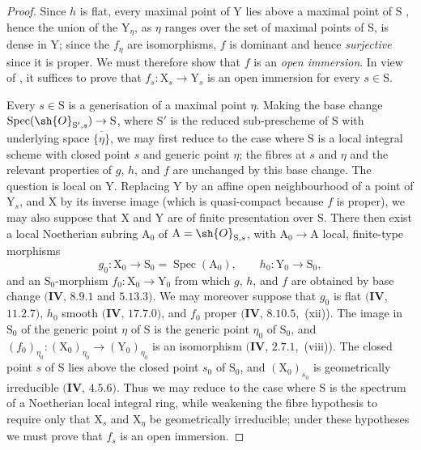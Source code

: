 \begin{proof}
Since $h$ is flat, every maximal point of $\mathrm{Y}$ lies above a maximal point of $\mathrm{S}$ , hence the union of the $\mathrm{Y}_\eta$, as $\eta$ ranges over the set of maximal points of $\mathrm{S}$, is dense in $\mathrm{Y}$; since the $f_\eta$ are isomorphisms, $f$ is dominant and hence \emph{surjective} since it is proper.
We must therefore show that $f$ is an \emph{open immersion}.
In view of , it suffices to prove that $f_s:\mathrm{X}_s\to\mathrm{Y}_s$ is an open immersion for every $s\in\mathrm{S}$.

Every $s\in\mathrm{S}$ is a generisation of a maximal point $\eta$.  Making the base change $\operatorname{Spec}(\sh{O}_{\mathrm{S}',s})\to\mathrm{S}$, where $\mathrm{S}'$ is the reduced sub-prescheme of $\mathrm{S}$ with underlying space $\overline{\{\eta\}}$, we may first reduce to the case where $\mathrm{S}$ is a local integral scheme with closed point $s$ and generic point $\eta$; the fibres at $s$ and $\eta$ and the relevant properties of $g$, $h$, and $f$ are unchanged by this base change.
The question is local on $\mathrm{Y}$.  Replacing $\mathrm{Y}$ by an affine open neighbourhood of a point of $\mathrm{Y}_s$, and $\mathrm{X}$ by its inverse image (which is quasi-compact because $f$ is proper), we may also suppose that $\mathrm{X}$ and $\mathrm{Y}$ are of finite presentation over $\mathrm{S}$.
There then exist a local Noetherian subring $\mathrm{A}_0$ of $\mathrm{A}=\sh{O}_{\mathrm{S},s}$, with $\mathrm{A}_0\to\mathrm{A}$ local, finite-type morphisms
\[
  g_0:\mathrm{X}_0\to\mathrm{S}_0=\operatorname{Spec}(\mathrm{A}_0),
  \qquad h_0:\mathrm{Y}_0\to\mathrm{S}_0,
\]
and an $\mathrm{S}_0$-morphism $f_0:\mathrm{X}_0\to\mathrm{Y}_0$ from which $g$, $h$, and $f$ are obtained by base change $(\mathbf{IV}$, $8.9.1$ and $5.13.3)$.  We may moreover suppose that $g_0$ is flat $(\mathbf{IV}$, $11.2.7)$, $h_0$ smooth $(\mathbf{IV}$, $17.7.0)$, and $f_0$ proper $(\mathbf{IV}$, $8.10.5$,~(xii)).
The image in $\mathrm{S}_0$ of the generic point $\eta$ of $\mathrm{S}$ is the generic point $\eta_0$ of $\mathrm{S}_0$, and $(f_0)_{\eta_0}:(\mathrm{X}_0)_{\eta_0}\to(\mathrm{Y}_0)_{\eta_0}$ is an isomorphism $(\mathbf{IV}$, $2.7.1$,~(viii)).  The closed point $s$ of $\mathrm{S}$ lies above the closed point $s_0$ of $\mathrm{S}_0$, and $(\mathrm{X}_0)_{s_0}$ is geometrically irreducible $(\mathbf{IV}$, $4.5.6)$.
Thus we may reduce to the case where $\mathrm{S}$ is the spectrum of a Noetherian local integral ring, while weakening the fibre hypothesis to require only that $\mathrm{X}_s$ and $\mathrm{X}_\eta$ be geometrically irreducible; under these hypotheses we must prove that $f_s$ is an open immersion.


\end{proof}
